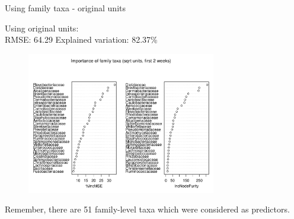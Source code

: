 \documentclass{beamer}
\begin{document}
\begin{frame}{Using family taxa - original units}

  {\scriptsize
    
  \noindent Using original units:\\
  RMSE: 64.29  \hspace{0.05in}  Explained variation: 82.37\%

  \begin{center}
    \begin{figure}
      \includegraphics[width=3.25in]{../only_families/first_two_weeks/sqrt_units_first_two_weeks_families_imp_plot}
    \end{figure}
  \end{center}
  \vspace{-0.25in}

\noindent Remember, there are 51 family-level taxa which were
considered as predictors.
}

\end{frame}
\end{document}
